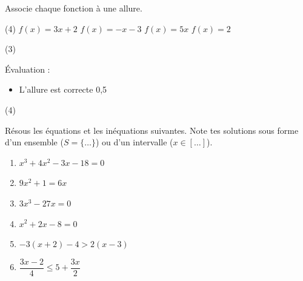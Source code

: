 \documentclass[a4paper, 12pt, parskip=half-, twoside=semi]{scrartcl}
\begin{document}
\newpage
\begin{connaitre}[points=2]
    Associe chaque fonction à une allure.
    \begin{tasks}(4)
        \task $f(x) = 3x+2$
        \task $f(x) = -x - 3$
        \task $f(x) = 5x$
        \task $f(x) = 2$
    \end{tasks}

    \begin{tasks}[label=\fbox{\arabic*}, label-width=15pt](3)
        \task 
        \task 
        \task 
        \task 
        \task 
        \task 
    \end{tasks}
\end{connaitre}
\begin{solution}
    Évaluation :
    \begin{itemize}
        \item L'allure est correcte \hfill 0,5
    \end{itemize}
    \begin{tasks}(4)
        \task {}
        \task {}
        \task {}
        \task {}
    \end{tasks}
\end{solution}
\begin{appliquer}[points=10]
    Résous les équations et les inéquations suivantes. Note tes solutions sous forme d'un ensemble (\(S = \{\dots\}\)) ou d'un intervalle (\(x \in [\dots]\)).
    \begin{enumerate}[cols=2]
        \item %
              $x^{3}+4x^{2}-3x -18=0$
        \item %
              $9x^{2}+1=6x$
        \item %
              $3x^{3}-27x=0$
        \item %
              $x^{2}+2x-8 =0$
        \item \(-3(x + 2)-4 > 2(x-3)\)
        \item \(\dfrac{3x-2}{4} \le 5 + \dfrac{3x}{2}\)
    \end{enumerate}
\end{appliquer}
\end{document}
